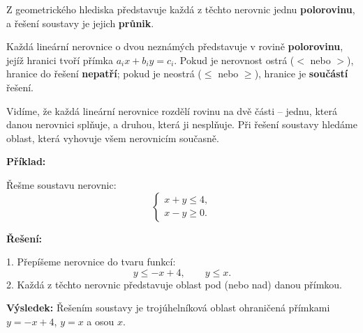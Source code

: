 \documentclass[12pt,a4paper]{article}
\begin{document}
\noindent
Z geometrického hlediska představuje každá z těchto nerovnic jednu \textbf{polorovinu},  
a řešení soustavy je jejich \textbf{průnik}.

\begin{notebox}
Každá lineární nerovnice o dvou neznámých představuje v rovině \textbf{polorovinu},  
jejíž hranici tvoří přímka \(a_i x + b_i y = c_i\).  
Pokud je nerovnost ostrá (\(<\) nebo \(>\)), hranice do řešení \textbf{nepatří};  
pokud je neostrá (\(\le\) nebo \(\ge\)), hranice je \textbf{součástí} řešení.
\end{notebox}

\begin{center}
\end{center}

\noindent
Vidíme, že každá lineární nerovnice rozdělí rovinu na dvě části – jednu, která danou nerovnici splňuje, a druhou, která ji nesplňuje.  
Při řešení soustavy hledáme oblast, která vyhovuje všem nerovnicím současně.

\begin{examplebox}
\textbf{Příklad:}

Řešme soustavu nerovnic:
\[
\begin{cases}
x + y \le 4,\\
x - y \ge 0.
\end{cases}
\]

\textbf{Řešení:}

1. Přepíšeme nerovnice do tvaru funkcí:
\[
y \le -x + 4, \qquad y \le x.
\]
2. Každá z těchto nerovnic představuje oblast pod (nebo nad) danou přímkou.

\begin{center}
\end{center}

\textbf{Výsledek:}  
Řešením soustavy je trojúhelníková oblast ohraničená přímkami \(y = -x + 4\), \(y = x\) a osou \(x\).
\end{examplebox}
\end{document}
